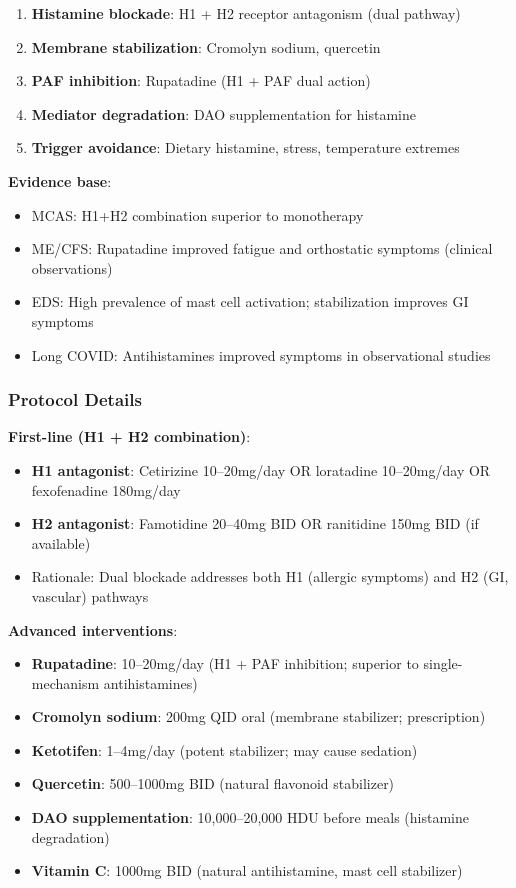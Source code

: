 \begin{enumerate}
    \item \textbf{Histamine blockade}: H1 + H2 receptor antagonism (dual pathway)
    \item \textbf{Membrane stabilization}: Cromolyn sodium, quercetin
    \item \textbf{PAF inhibition}: Rupatadine (H1 + PAF dual action)
    \item \textbf{Mediator degradation}: DAO supplementation for histamine
    \item \textbf{Trigger avoidance}: Dietary histamine, stress, temperature extremes
\end{enumerate}

\textbf{Evidence base}:
\begin{itemize}
    \item MCAS: H1+H2 combination superior to monotherapy~\cite{Afrin2016}
    \item ME/CFS: Rupatadine improved fatigue and orthostatic symptoms (clinical observations)
    \item EDS: High prevalence of mast cell activation; stabilization improves GI symptoms~\cite{Seneviratne2017}
    \item Long COVID: Antihistamines improved symptoms in observational studies
\end{itemize}

\subsubsection{Protocol Details}

\textbf{First-line (H1 + H2 combination)}:
\begin{itemize}
    \item \textbf{H1 antagonist}: Cetirizine 10--20mg/day OR loratadine 10--20mg/day OR fexofenadine 180mg/day
    \item \textbf{H2 antagonist}: Famotidine 20--40mg BID OR ranitidine 150mg BID (if available)
    \item Rationale: Dual blockade addresses both H1 (allergic symptoms) and H2 (GI, vascular) pathways
\end{itemize}

\textbf{Advanced interventions}:
\begin{itemize}
    \item \textbf{Rupatadine}: 10--20mg/day (H1 + PAF inhibition; superior to single-mechanism antihistamines)
    \item \textbf{Cromolyn sodium}: 200mg QID oral (membrane stabilizer; prescription)
    \item \textbf{Ketotifen}: 1--4mg/day (potent stabilizer; may cause sedation)
    \item \textbf{Quercetin}: 500--1000mg BID (natural flavonoid stabilizer)
    \item \textbf{DAO supplementation}: 10,000--20,000 HDU before meals (histamine degradation)
    \item \textbf{Vitamin C}: 1000mg BID (natural antihistamine, mast cell stabilizer)
\end{itemize}

